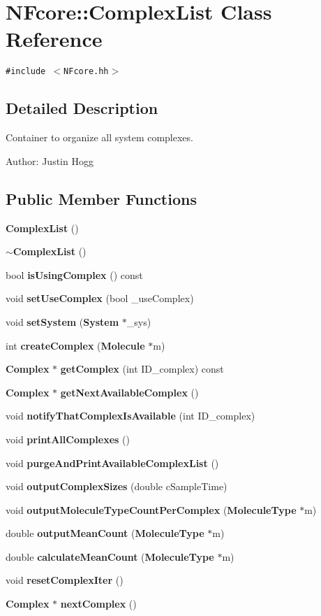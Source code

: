 \section{NFcore::ComplexList Class Reference}
\label{classNFcore_1_1ComplexList}
{\tt \#include $<$NFcore.hh$>$}



\subsection{Detailed Description}
Container to organize all system complexes. 

\begin{Desc}
\item[Author:]Justin Hogg \end{Desc}
\subsection*{Public Member Functions}
\begin{CompactItemize}
\item 
{\bf ComplexList} ()
\item 
{\bf $\sim$ComplexList} ()
\item 
bool {\bf isUsingComplex} () const 
\item 
void {\bf setUseComplex} (bool \_\-useComplex)
\item 
void {\bf setSystem} ({\bf System} $\ast$\_\-sys)
\item 
int {\bf createComplex} ({\bf Molecule} $\ast$m)
\item 
{\bf Complex} $\ast$ {\bf getComplex} (int ID\_\-complex) const 
\item 
{\bf Complex} $\ast$ {\bf getNextAvailableComplex} ()
\item 
void {\bf notifyThatComplexIsAvailable} (int ID\_\-complex)
\item 
void {\bf printAllComplexes} ()
\item 
void {\bf purgeAndPrintAvailableComplexList} ()
\item 
void {\bf outputComplexSizes} (double cSampleTime)
\item 
void {\bf outputMoleculeTypeCountPerComplex} ({\bf MoleculeType} $\ast$m)
\item 
double {\bf outputMeanCount} ({\bf MoleculeType} $\ast$m)
\item 
double {\bf calculateMeanCount} ({\bf MoleculeType} $\ast$m)
\item 
void {\bf resetComplexIter} ()
\item 
{\bf Complex} $\ast$ {\bf nextComplex} ()
\end{CompactItemize}
